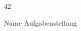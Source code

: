 \documentclass{article}
\begin{document}
    \begin{ukon-infie}[Abgabedatum]{42}

        \begin{exercise}[p=1,z=2]{Name} %
        	Aufgabenstellung
        \end{exercise}

    \end{ukon-infie}
\end{document}
